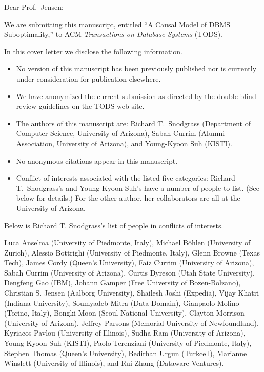 \documentclass{letter} %
\begin{document}
\begin{letter}
 
\opening{Dear Prof.~Jensen:} 
 
We are submitting this manuscript, entitled ``A Causal Model of DBMS Suboptimality,'' to ACM {\em \hbox{Transactions} on Database Systems} (TODS).

In this cover letter we disclose the following information.

\begin{itemize}

\item No version of this manuscript has been previously published nor is
  currently under consideration for publication elsewhere. 

\item We have anonymized the current submission as directed by the double-blind
review guidelines on the TODS web site. 
 
\item The authors of this manuscript are: Richard T.~Snodgrass (Department of
  Computer Science, University of Arizona), Sabah Currim (Alumni
  Association, University of Arizona), and Young-Kyoon Suh (KISTI). 
\item No anonymous citations appear in this manuscript.
\item Conflict of interests associated with the listed five categories:
  Richard T.~Snodgrass's and Young-Kyoon Suh's have a number of people to list. (See
  below for details.) For the other author, her collaborators are all at
  the University of Arizona.
\end{itemize} 

Below is Richard T. Snodgrass's list of people in conflicts of interests.

Luca Anselma (University of Piedmonte, Italy), Michael B\"{o}hlen
(University of Zurich), Alessio Bottrighi (University of Piedmonte, Italy),
Glenn Browne (Texas Tech), James Cordy (Queen's University), Faiz \hbox{Currim} (University of Arizona), Sabah
Currim (University of Arizona), Curtis Dyreson (Utah State University),
Dengfeng Gao (IBM), Johann Gamper (Free University of Bozen-Bolzano), Christian S. Jensen (Aalborg
University), Shailesh Joshi (Expedia), Vijay Khatri (Indiana University),
Soumyadeb Mitra (Data Domain), Gianpaolo Molino (Torino, Italy), Bongki Moon (Seoul National University), Clayton
Morrison (University of Arizona), Jeffrey Parsons (Memorial University of
Newfoundland), Kyriacos Pavlou (University of Illinois), Sudha Ram
(University of Arizona), Young-Kyoon Suh (KISTI), Paolo Terenziani (University of Piedmonte, Italy),
Stephen Thomas (Queen's University), Bedirhan Urgun (Turkcell), Marianne
Winslett (University of Illinois), and Rui Zhang (Dataware Ventures).\\


\end{letter}
\end{document}

